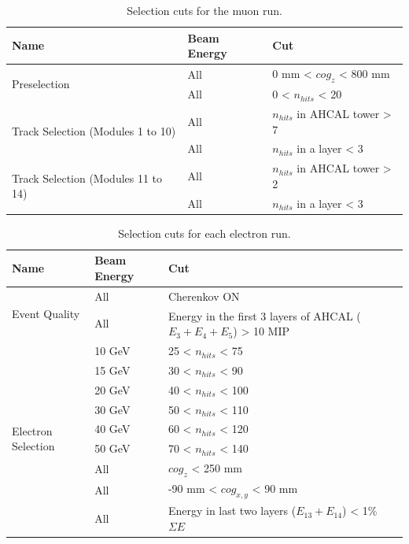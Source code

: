 \documentclass{JINST}
\begin{document}
\begin{table}[htb!]
  \centering
  \caption{Selection cuts for the muon run.}
  \label{table:muon_sel}
  \begin{tabular}{@{}lll@{}}
    \toprule
    \multicolumn{1}{l}{\textbf{Name}} & \textbf{Beam Energy} & \textbf{Cut}\\
    \midrule
    \multirow{2}{*}{Preselection}& All & 0 mm < $cog_{z}$ < 800 mm\\& All & 0 < $n_{hits}$ < 20 \\
    \midrule
    \multirow{2}{*}{Track Selection (Modules 1 to 10)}& All & $n_{hits}$ in AHCAL tower > 7 \\& All & $n_{hits}$ in a layer < 3 \\
    \midrule
    \multirow{2}{*}{Track Selection (Modules 11 to 14)}& All & $n_{hits}$ in AHCAL tower > 2 \\& All & $n_{hits}$ in a layer < 3 \\
    \bottomrule
  \end{tabular}
\end{table}

\begin{table}[htb!]
  \centering
  \caption{Selection cuts for each electron run.}
  \label{table:electron_sel}
  \begin{tabular}{@{}lll@{}}
    \toprule
    \multicolumn{1}{l}{\textbf{Name}} & \textbf{Beam Energy} & \textbf{Cut}\\
    \midrule
    \multirow{2}{*}{Event Quality}& All & Cherenkov ON\\& All & Energy in the first 3 layers of AHCAL ($E_3 + E_4 + E_5$) > 10 MIP \\
    \midrule
    \multirow{9}{*}{Electron Selection}& 10 GeV & 25 < $n_{hits}$ < 75 \\& 15 GeV & 30 < $n_{hits}$ < 90 \\& 20 GeV & 40 < $n_{hits}$ < 100 \\& 30 GeV & 50 < $n_{hits}$ < 110 \\& 40 GeV & 60 < $n_{hits}$ < 120 \\& 50 GeV & 70 < $n_{hits}$ < 140 \\& All & $cog_{z}$ < 250 mm\\& All & -90 mm < $cog_{x, y}$ < 90 mm \\& All & Energy in last two layers ($E_{13} + E_{14}$) < 1\% $\Sigma E$ \\
    \bottomrule
  \end{tabular}
\end{table}
\end{document}

